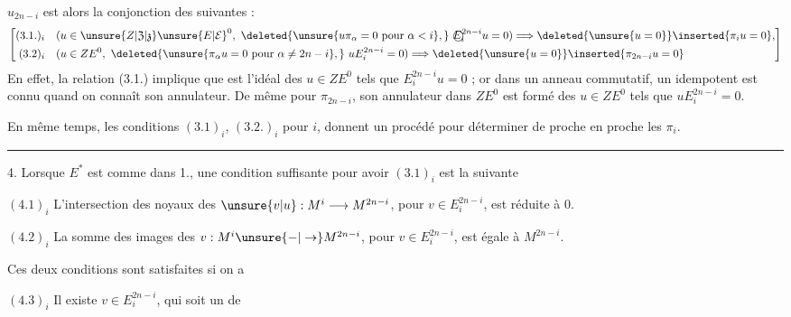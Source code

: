 
$u_{2n-i}$ est alors la  conjonction des suivantes :
\[
\left[\begin{aligned}
 (3.1.)_i\quad &(u\in \unsure{Z|\mathfrak Z|\mathfrak z}\unsure{E|\mathcal E}^0,\ \deleted{\unsure{u\pi_\alpha=0\ \text{pour }\alpha<i},}\ 
 \text{\textcircled{$E_i^{2n-i}$}}u=0)\Longrightarrow \deleted{\unsure{u=0}}\inserted{\pi_i u=0},\\
 (3.2)_i\quad &(u\in ZE^0,\ \deleted{\unsure{\pi_\alpha u=0\ \text{pour }\alpha\ne 2n-i},}\ uE_i^{2n-i}=0)
 \Longrightarrow\deleted{\unsure{u=0}}\inserted{\pi_{2n-i}u=0}
\end{aligned}\right]
\]
En effet, la relation (3.1.) implique que   est l'idéal des $u\in ZE^0$ tels que $E_i^{2n-i}u=0$ ; or dans un anneau commutatif, un idempotent est connu quand on connaît son annulateur. De même pour $\pi_{2n-i}$, son annulateur dans $ZE^0$ est formé des $u\in ZE^0$ tels que $uE_i^{2n-i}=0$.

En même temps, les conditions $(3.1)_i$, $(3.2.)_i$ pour  $i$, donnent un  procédé pour déterminer de proche en proche les $\pi_i$.

\medskip\hrule\medskip

4. Lorsque $E^*$ est comme dans 1., une condition suffisante pour avoir $(3.1)_i$  est la  suivante

$(4.1)_i$ L'intersection des noyaux des $\unsure{v|u}:M^i\longrightarrow M^{2n-i}$, pour $v\in E_i^{2n-i}$, est réduite à 0.

$(4.2)_i$ La somme des images des $v:M^i\unsure{-|\to}M^{2n-i}$, pour $v\in E_i^{2n-i}$, est  égale à $M^{2n-i}$.

Ces deux conditions sont satisfaites si on a

$(4.3)_i$ Il existe  $v\in E_i^{2n-i}$, qui soit un  de
